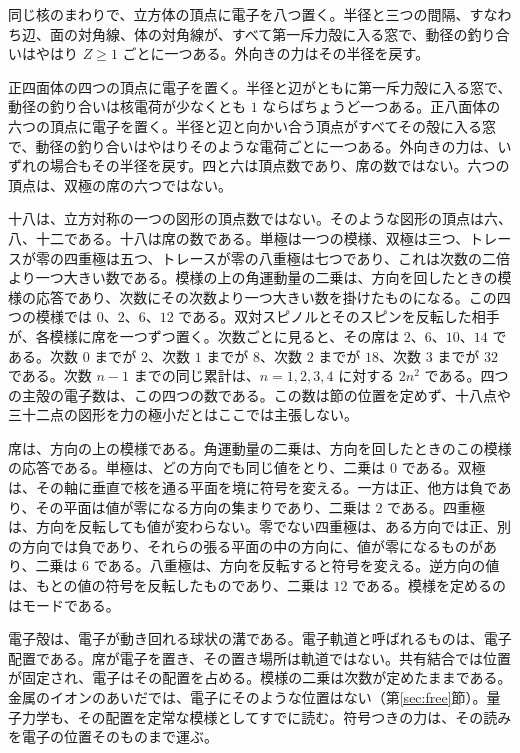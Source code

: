 \documentclass[a4paper]{article}
\begin{document}
同じ核のまわりで、立方体の頂点に電子を八つ置く。半径と三つの間隔、すなわち辺、面の対角線、体の対角線が、すべて第一斥力殻に入る窓で、動径の釣り合いはやはり \(Z\ge 1\) ごとに一つある。外向きの力はその半径を戻す。

正四面体の四つの頂点に電子を置く。半径と辺がともに第一斥力殻に入る窓で、動径の釣り合いは核電荷が少なくとも \(1\) ならばちょうど一つある。正八面体の六つの頂点に電子を置く。半径と辺と向かい合う頂点がすべてその殻に入る窓で、動径の釣り合いはやはりそのような電荷ごとに一つある。外向きの力は、いずれの場合もその半径を戻す。四と六は頂点数であり、席の数ではない。六つの頂点は、双極の席の六つではない。

十八は、立方対称の一つの図形の頂点数ではない。そのような図形の頂点は六、八、十二である。十八は席の数である。単極は一つの模様、双極は三つ、トレースが零の四重極は五つ、トレースが零の八重極は七つであり、これは次数の二倍より一つ大きい数である。模様の上の角運動量の二乗は、方向を回したときの模様の応答であり、次数にその次数より一つ大きい数を掛けたものになる。この四つの模様では \(0\)、\(2\)、\(6\)、\(12\) である。双対スピノルとそのスピンを反転した相手が、各模様に席を一つずつ置く。次数ごとに見ると、その席は \(2\)、\(6\)、\(10\)、\(14\) である。次数 \(0\) までが \(2\)、次数 \(1\) までが \(8\)、次数 \(2\) までが \(18\)、次数 \(3\) までが \(32\) である。次数 \(n-1\) までの同じ累計は、\(n=1,2,3,4\) に対する \(2n^{2}\) である。四つの主殻の電子数は、この四つの数である。この数は節の位置を定めず、十八点や三十二点の図形を力の極小だとはここでは主張しない。

席は、方向の上の模様である。角運動量の二乗は、方向を回したときのこの模様の応答である。単極は、どの方向でも同じ値をとり、二乗は \(0\) である。双極は、その軸に垂直で核を通る平面を境に符号を変える。一方は正、他方は負であり、その平面は値が零になる方向の集まりであり、二乗は \(2\) である。四重極は、方向を反転しても値が変わらない。零でない四重極は、ある方向では正、別の方向では負であり、それらの張る平面の中の方向に、値が零になるものがあり、二乗は \(6\) である。八重極は、方向を反転すると符号を変える。逆方向の値は、もとの値の符号を反転したものであり、二乗は \(12\) である。模様を定めるのはモードである。

電子殻は、電子が動き回れる球状の溝である。電子軌道と呼ばれるものは、電子配置である。席が電子を置き、その置き場所は軌道ではない。共有結合では位置が固定され、電子はその配置を占める。模様の二乗は次数が定めたままである。金属のイオンのあいだでは、電子にそのような位置はない（第\ref{sec:free}節）。量子力学も、その配置を定常な模様としてすでに読む。符号つきの力は、その読みを電子の位置そのものまで運ぶ。
\end{document}
